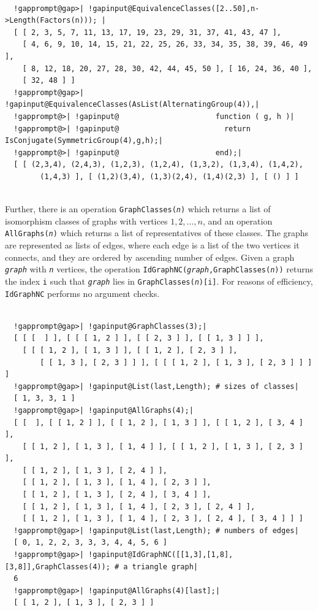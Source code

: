 \documentclass[a4paper,11pt]{report}
\begin{document}
{{ 
\begin{Verbatim}[commandchars=!@|,fontsize=\small,frame=single,label=Example]
  
  !gapprompt@gap>| !gapinput@EquivalenceClasses([2..50],n->Length(Factors(n))); |
  [ [ 2, 3, 5, 7, 11, 13, 17, 19, 23, 29, 31, 37, 41, 43, 47 ], 
    [ 4, 6, 9, 10, 14, 15, 21, 22, 25, 26, 33, 34, 35, 38, 39, 46, 49 ], 
    [ 8, 12, 18, 20, 27, 28, 30, 42, 44, 45, 50 ], [ 16, 24, 36, 40 ], 
    [ 32, 48 ] ]
  !gapprompt@gap>| !gapinput@EquivalenceClasses(AsList(AlternatingGroup(4)),|
  !gapprompt@>| !gapinput@                      function ( g, h )|
  !gapprompt@>| !gapinput@                        return IsConjugate(SymmetricGroup(4),g,h);|
  !gapprompt@>| !gapinput@                      end);|
  [ [ (2,3,4), (2,4,3), (1,2,3), (1,2,4), (1,3,2), (1,3,4), (1,4,2), 
        (1,4,3) ], [ (1,2)(3,4), (1,3)(2,4), (1,4)(2,3) ], [ () ] ]
  
\end{Verbatim}
    Further, there is an operation \texttt{GraphClasses(\mbox{\texttt{\mdseries\slshape n}})} which returns a list of isomorphism classes of graphs with vertices $1, 2, \dots, n$, and an operation \texttt{AllGraphs(\mbox{\texttt{\mdseries\slshape n}})} which returns a list of representatives of these classes. The graphs are
represented as lists of edges, where each edge is a list of the two vertices
it connects, and they are ordered by ascending number of edges. Given a graph \mbox{\texttt{\mdseries\slshape graph}} with \mbox{\texttt{\mdseries\slshape n}} vertices, the operation \texttt{IdGraphNC(\mbox{\texttt{\mdseries\slshape graph}},GraphClasses(\mbox{\texttt{\mdseries\slshape n}}))} returns the index \texttt{i} such that \mbox{\texttt{\mdseries\slshape graph}} lies in \texttt{GraphClasses(\mbox{\texttt{\mdseries\slshape n}})[i]}. For reasons of efficiency, \texttt{IdGraphNC} performs no argument checks. 

 
\begin{Verbatim}[commandchars=!@|,fontsize=\small,frame=single,label=Example]
  
  !gapprompt@gap>| !gapinput@GraphClasses(3);|
  [ [ [  ] ], [ [ [ 1, 2 ] ], [ [ 2, 3 ] ], [ [ 1, 3 ] ] ], 
    [ [ [ 1, 2 ], [ 1, 3 ] ], [ [ 1, 2 ], [ 2, 3 ] ], 
        [ [ 1, 3 ], [ 2, 3 ] ] ], [ [ [ 1, 2 ], [ 1, 3 ], [ 2, 3 ] ] ] ]
  !gapprompt@gap>| !gapinput@List(last,Length); # sizes of classes|
  [ 1, 3, 3, 1 ]
  !gapprompt@gap>| !gapinput@AllGraphs(4);|
  [ [  ], [ [ 1, 2 ] ], [ [ 1, 2 ], [ 1, 3 ] ], [ [ 1, 2 ], [ 3, 4 ] ], 
    [ [ 1, 2 ], [ 1, 3 ], [ 1, 4 ] ], [ [ 1, 2 ], [ 1, 3 ], [ 2, 3 ] ], 
    [ [ 1, 2 ], [ 1, 3 ], [ 2, 4 ] ], 
    [ [ 1, 2 ], [ 1, 3 ], [ 1, 4 ], [ 2, 3 ] ], 
    [ [ 1, 2 ], [ 1, 3 ], [ 2, 4 ], [ 3, 4 ] ], 
    [ [ 1, 2 ], [ 1, 3 ], [ 1, 4 ], [ 2, 3 ], [ 2, 4 ] ], 
    [ [ 1, 2 ], [ 1, 3 ], [ 1, 4 ], [ 2, 3 ], [ 2, 4 ], [ 3, 4 ] ] ]
  !gapprompt@gap>| !gapinput@List(last,Length); # numbers of edges|
  [ 0, 1, 2, 2, 3, 3, 3, 4, 4, 5, 6 ]
  !gapprompt@gap>| !gapinput@IdGraphNC([[1,3],[1,8],[3,8]],GraphClasses(4)); # a triangle graph|
  6
  !gapprompt@gap>| !gapinput@AllGraphs(4)[last];|
  [ [ 1, 2 ], [ 1, 3 ], [ 2, 3 ] ]
  

\end{Verbatim}}}
\end{document}
